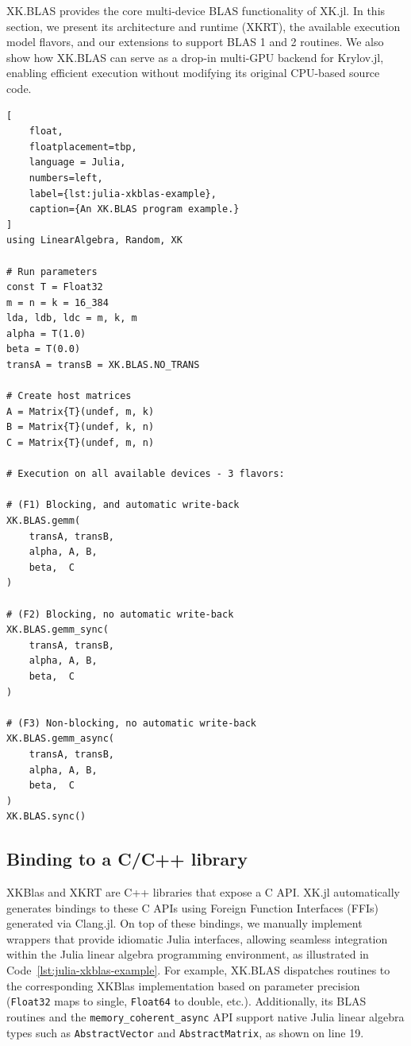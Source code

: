 \documentclass{juliacon}
\begin{document}
XK.BLAS provides the core multi-device BLAS functionality of XK.jl.  
In this section, we present its architecture and runtime (XKRT), the available execution model flavors, and our extensions to support BLAS 1 and 2 routines.  
We also show how XK.BLAS can serve as a drop-in multi-GPU backend for Krylov.jl, enabling efficient execution without modifying its original CPU-based source code.

\begin{lstlisting}[
    float,
    floatplacement=tbp,
    language = Julia, 
    numbers=left, 
    label={lst:julia-xkblas-example},
    caption={An XK.BLAS program example.}
]
using LinearAlgebra, Random, XK

# Run parameters
const T = Float32
m = n = k = 16_384
lda, ldb, ldc = m, k, m
alpha = T(1.0)
beta = T(0.0)
transA = transB = XK.BLAS.NO_TRANS

# Create host matrices
A = Matrix{T}(undef, m, k)
B = Matrix{T}(undef, k, n)
C = Matrix{T}(undef, m, n)

# Execution on all available devices - 3 flavors:

# (F1) Blocking, and automatic write-back
XK.BLAS.gemm(
    transA, transB,
    alpha, A, B,
    beta,  C
)

# (F2) Blocking, no automatic write-back
XK.BLAS.gemm_sync(
    transA, transB,
    alpha, A, B,
    beta,  C
)

# (F3) Non-blocking, no automatic write-back
XK.BLAS.gemm_async(
    transA, transB,
    alpha, A, B,
    beta,  C
)
XK.BLAS.sync()
\end{lstlisting}

\subsection{Binding to a C/C++ library}

XKBlas and XKRT are C++ libraries that expose a C API.  
XK.jl automatically generates bindings to these C APIs using Foreign Function Interfaces (FFIs) generated via Clang.jl.  
On top of these bindings, we manually implement wrappers that provide idiomatic Julia interfaces, allowing seamless integration within the Julia linear algebra programming environment, as illustrated in Code~\ref{lst:julia-xkblas-example}.  
For example, XK.BLAS dispatches routines to the corresponding XKBlas implementation based on parameter precision (\texttt{Float32} maps to single, \texttt{Float64} to double, etc.).  
Additionally, its BLAS routines and the \texttt{memory\_coherent\_async} API support native Julia linear algebra types such as \texttt{AbstractVector} and \texttt{AbstractMatrix}, as shown on line 19.
\end{document}
